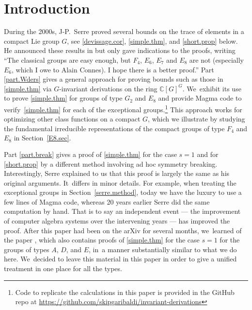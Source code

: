 \documentclass[JEP,XML,SOM,Unicode,NoFloatCountersInSection,published]{cedram}
\theoremstyle{definition}
\newcommand{\C}{\mathbb{C}}
\begin{document}
\maketitle
\vspace*{1.5\baselineskip}
{\let\\ \xspace\tableofcontents}

\mainmatter
\section{Introduction}

During the 2000s,
J-P.~Serre proved several bounds on the trace of elements in a compact Lie group $G$, see \ref{devissage.cor}, \ref{simple.thm}, and \ref{short.prop} below. He announced these results in \cite{Se:trace} but only gave indications to the proofs, writing
``The classical groups are easy enough, but $F_4$, $E_6$, $E_7$ and $E_8$ are not (especially $E_6$, which I owe to Alain Connes). I hope there is a better proof.'' Part \ref{part.Wders} gives a general approach for proving bounds such as those in \ref{simple.thm} via $G$-invariant derivations on the ring $\C[G]^G$. We~exhibit its use to prove \ref{simple.thm} for groups of type $G_2$ and $E_8$ and provide Magma \cite{Magma} code to verify~\ref{simple.thm} for each of the exceptional groups.\footnote{Code to replicate the calculations in this paper is provided in the GitHub repo at \url{https://github.com/skipgaribaldi/invariant-derivations}} This approach works for optimizing other class functions on a compact $G$, which we illustrate by studying the fundamental irreducible representations of the compact groups of type $F_4$ and $E_8$ in Section~\ref{E8.sec}.

Part \ref{part.break} gives a proof of \ref{simple.thm} for the case $s = 1$ and for \ref{short.prop} by a different method involving ad hoc symmetry breaking. Interestingly, Serre explained to us that this proof is largely the same as his original arguments. It~differs in minor details. For example, when treating the exceptional groups in Section~\ref{serre.method}, today we have the luxury to use a few lines of Magma code, whereas 20 years earlier Serre did the same computation by hand. That is to say an independent event --- the improvement of computer algebra systems over the intervening years --- has improved the proof. After this paper had been on the arXiv for several months, we~learned of the paper \cite{DMMV}, which also contains proofs of \ref{simple.thm} for the case $s=1$ for the groups of types $A$, $D$, and $E$, in~a manner substantially similar to what we do here. We~decided to leave this material in this paper in order to give a unified treatment in one place for all the types.
\end{document}
